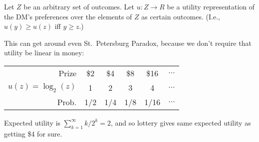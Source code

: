 \begin{slide}

Let $Z$ be an arbitrary set of outcomes. Let $u:Z\rightarrow R$ be a utility
representation of the DM's preferences over the elements of $Z$ as certain
outcomes. (I.e., $u(y)\geq u(z)$ iff $y \geq z$.)

\end{slide}


\begin{slide}

This can get around even St.\ Petersburg Paradox, because we don't require
that utility be linear in money:

\begin{center}
  \begin{tabular}{r|c|c|c|c|c}\cline{2-6}
    Prize & \$2 & \$4 & \$8 & \$16 & $\ldots$\\ \cline{2-6}
    $u(z)=\log_2(z)$ & 1 & 2 & 3 & 4 & $\ldots$ \\ \cline{2-6}
    Prob. & 1/2 &  1/4 & 1/8 & 1/16 & $\ldots$\\ \cline{2-6}
  \end{tabular}
\end{center}

Expected utility is $\sum_{k=1}^\infty k/2^k = 2$, and so lottery gives same
expected utility as getting \$4 for sure.
\end{slide}



